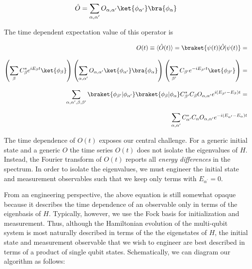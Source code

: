 \begin{equation}
    \label{observable}
    \hat{O} = \sum_{\alpha,\alpha^{\prime}} O_{\alpha,\alpha^{\prime}} \ket{\phi_{\alpha^{\prime}}} \bra{\phi_{\alpha}}
\end{equation}

\noindent The time dependent expectation value of this operator is

\begin{equation*}
    \label{derive_energy_differences}
    \begin{aligned}
        O(t) \equiv \langle \hat{O}(t) \rangle =\braket{\psi(t)|\hat{O}|\psi(t)} = \\[2.0ex]
        \left( \sum_{\beta} C^{*}_{\beta} e^{i E_{\beta} t} \ket{\phi_{\beta}} \right)
        \left( \sum_{\alpha,\alpha^{\prime}} O_{\alpha,\alpha^{\prime}} \ket{\phi_{\alpha^{\prime}}} \bra{\phi_{\alpha}} \right)
        \left( \sum_{\beta^{\prime}} C_{\beta^{\prime}} e^{- i E_{\beta^{\prime}} t} \ket{\phi_{\beta^{\prime}}} \right) = \\[2.0ex]
        \sum_{\alpha, \alpha^{\prime}, \beta, \beta^{\prime} }
        \braket{\phi_{\beta^{\prime}}|\phi_{\alpha^{\prime}}}
        \braket{\phi_{\beta}|\phi_{\alpha}}
        C_{\beta^{\prime}}^{*} C_{\beta} O_{\alpha, \alpha^{\prime}} e^{i (E_{\beta^\prime} - E_{\beta}) t} = \\[2.0ex]
        \sum_{\alpha, \alpha^{\prime}} C^{*}_{\alpha^{\prime}} C_{\alpha} O_{\alpha, \alpha^{\prime}} e^{- i (E_{\alpha^{\prime}} - E_{\alpha}) t}
    \end{aligned}
\end{equation*}

\noindent The time dependence of $O(t)$ exposes our central challenge.
For a generic initial state and a generic $\hat{O}$ the time series $O(t)$ does not isolate the eigenvalues of $H$.
Instead, the Fourier transform of $O(t)$ reports all \textit{energy differences} in the spectrum.
In order to isolate the eigenvalues, we must engineer the initial state and measurement observables such that we keep only terms with $E_{\alpha^{\prime}}=0$.

From an engineering perspective,
the above equation is still somewhat opaque because it describes the time dependence of an observable only in terms of the eigenbasis of $H$.
Typically, however, we use the Fock basis for initialization and measurement.
Thus, although the Hamiltonian evolution of the multi-qubit system is most naturally described in terms of the the eigenstates of $H$,
the initial state and measurement observable that we wish to engineer are best described in terms of a product of single qubit states.
Schematically, we can diagram our algorithm as follows:

